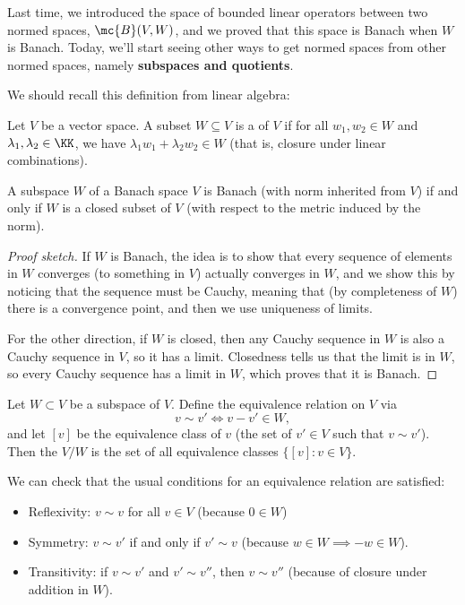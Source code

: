 Last time, we introduced the space of bounded linear operators between two normed spaces, $\mc{B}(V, W)$, and we proved that this space is Banach when $W$ is Banach. Today, we'll start seeing other ways to get normed spaces from other normed spaces, namely \textbf{subspaces and quotients}.

We should recall this definition from linear algebra:

\begin{definition}
Let $V$ be a vector space. A subset $W \subseteq V$ is a  of $V$ if for all $w_1, w_2 \in W$ and $\lambda_1, \lambda_2 \in \KK$, we have $\lambda_1 w_1 + \lambda_2 w_2 \in W$ (that is, closure under linear combinations).
\end{definition}

\begin{proposition}
A subspace $W$ of a Banach space $V$ is Banach (with norm inherited from $V$) if and only if $W$ is a closed subset of $V$ (with respect to the metric induced by the norm).
\end{proposition}
\begin{proof}[Proof sketch]
If $W$ is Banach, the idea is to show that every sequence of elements in $W$ converges (to something in $V$) actually converges in $W$, and we show this by noticing that the sequence must be Cauchy, meaning that (by completeness of $W$) there is a convergence point, and then we use uniqueness of limits. 

For the other direction, if $W$ is closed, then any Cauchy sequence in $W$ is also a Cauchy sequence in $V$, so it has a limit. Closedness tells us that the limit is in $W$, so every Cauchy sequence has a limit in $W$, which proves that it is Banach.
\end{proof}

\begin{definition}
Let $W \subset V$ be a subspace of $V$. Define the equivalence relation on $V$ via 
\[
    v \sim v' \iff v - v' \in W,
\]
and let $[v]$ be the equivalence class of $v$ (the set of $v' \in V$ such that $v \sim v'$). Then the  $V/W$ is the set of all equivalence classes $\{[v]: v \in V\}$.
\end{definition}

We can check that the usual conditions for an equivalence relation are satisfied:

\begin{itemize}
    \item Reflexivity: $v \sim v$ for all $v \in V$ (because $0 \in W$)
    \item Symmetry: $v \sim v'$ if and only if $v' \sim v$ (because $w \in W \implies -w \in W$).
    \item Transitivity: if $v \sim v'$ and $v' \sim v''$, then $v \sim v''$ (because of closure under addition in $W$).
\end{itemize}

